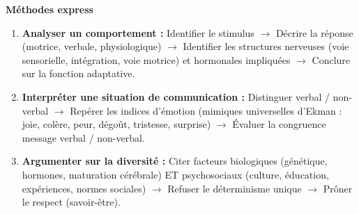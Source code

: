 \documentclass[11pt]{article}
\begin{document}
\begin{bilan}
\textbf{Méthodes express}
\begin{enumerate}
  \item \textbf{Analyser un comportement :} Identifier le stimulus $\to$ Décrire la réponse (motrice, verbale, physiologique) $\to$ Identifier les structures nerveuses (voie sensorielle, intégration, voie motrice) et hormonales impliquées $\to$ Conclure sur la fonction adaptative.
  \item \textbf{Interpréter une situation de communication :} Distinguer verbal / non-verbal $\to$ Repérer les indices d'émotion (mimiques universelles d'Ekman : joie, colère, peur, dégoût, tristesse, surprise) $\to$ Évaluer la congruence message verbal / non-verbal.
  \item \textbf{Argumenter sur la diversité :} Citer facteurs biologiques (génétique, hormones, maturation cérébrale) ET psychosociaux (culture, éducation, expériences, normes sociales) $\to$ Refuser le déterminisme unique $\to$ Prôner le respect (savoir-être).
\end{enumerate}

\end{bilan}
\end{document}
